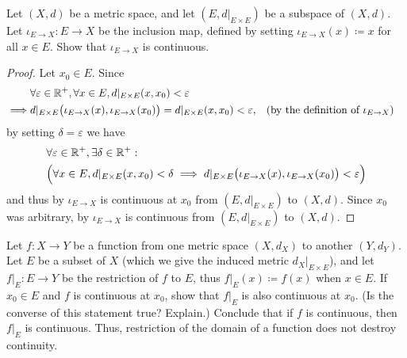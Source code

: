 \begin{ex}\label{ii:ex:2.1.5}
  Let \((X, d)\) be a metric space, and let \((E, d|_{E \times E})\) be a subspace of \((X, d)\).
  Let \(\iota_{E \to X} : E \to X\) be the inclusion map, defined by setting \(\iota_{E \to X}(x) \coloneqq x\) for all \(x \in E\).
  Show that \(\iota_{E \to X}\) is continuous.
\end{ex}

\begin{proof}
  Let \(x_0 \in E\).
  Since
  \begin{align*}
             & \forall \varepsilon \in \mathbb{R}^+, \forall x \in E, d|_{E \times E}(x, x_0) < \varepsilon                                                                              \\
    \implies & d|_{E \times E}\big(\iota_{E \to X}(x), \iota_{E \to X}(x_0)\big) = d|_{E \times E}(x, x_0) < \varepsilon, &  & \text{(by the definition of \(\iota_{E \to X}\))}
  \end{align*}
  by setting \(\delta = \varepsilon\) we have
  \begin{align*}
     & \forall \varepsilon \in \mathbb{R}^+, \exists \delta \in \mathbb{R}^+ :                                                                                              \\
     & \Big(\forall x \in E, d|_{E \times E}(x, x_0) < \delta \implies d|_{E \times E}\big(\iota_{E \to X}(x), \iota_{E \to X}(x_0)\big) < \varepsilon\Big)
  \end{align*}
  and thus by  \(\iota_{E \to X}\) is continuous at \(x_0\) from \((E, d|_{E \times E})\) to \((X, d)\).
  Since \(x_0\) was arbitrary, by  \(\iota_{E \to X}\) is continuous from \((E, d|_{E \times E})\) to \((X, d)\).
\end{proof}

\begin{ex}\label{ii:ex:2.1.6}
  Let \(f : X \to Y\) be a function from one metric space \((X, d_X)\) to another \((Y, d_Y)\).
  Let \(E\) be a subset of \(X\) (which we give the induced metric \(d_X|_{E \times E}\)), and let \(f|_E : E \to Y\) be the restriction of \(f\) to \(E\), thus \(f|_E(x) \coloneqq f(x)\) when \(x \in E\).
  If \(x_0 \in E\) and \(f\) is continuous at \(x_0\), show that \(f|_E\) is also continuous at \(x_0\).
  (Is the converse of this statement true? Explain.)
  Conclude that if \(f\) is continuous, then \(f|_E\) is continuous.
  Thus, restriction of the domain of a function does not destroy continuity.
\end{ex}

